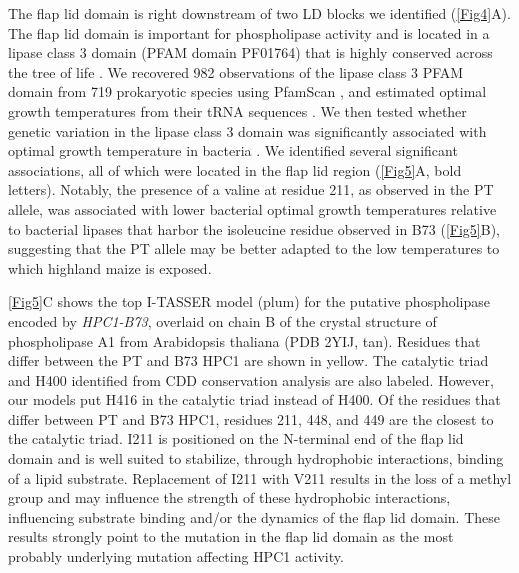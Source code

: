 \documentclass[9pt,twocolumn,twoside,lineno]{biorxiv}
\begin{document}
The flap lid domain is right downstream of two LD blocks we identified (\cref{Fig4}A). 
The flap lid domain is important for phospholipase activity and is located in a lipase class 3 domain (PFAM domain PF01764) that is highly conserved across the tree of life \cite{Jensen2021-zm}. 
We recovered 982 observations of the lipase class 3 PFAM domain from 719 prokaryotic species using PfamScan \cite{Potter2018-tk, El-Gebali2019-pw}, and estimated optimal growth temperatures from their tRNA sequences \cite{Cimen2020-dm}.
We then tested whether genetic variation in the lipase class 3 domain was significantly associated with optimal growth temperature in bacteria \cite{Jensen2021-iv}. 
We identified several significant associations, all of which were located in the flap lid region (\cref{Fig5}A, bold letters).  
Notably, the presence of a valine at residue 211, as observed in the PT allele, was associated with lower bacterial optimal growth temperatures relative to bacterial lipases that harbor the isoleucine residue observed in B73 (\cref{Fig5}B), suggesting that the PT allele may be better adapted to the low temperatures to which highland maize is exposed.

\cref{Fig5}C shows the top I-TASSER model (plum) for the putative phospholipase encoded by \textit{HPC1-B73}, overlaid on chain B of the crystal structure of phospholipase A1 from Arabidopsis thaliana (PDB 2YIJ, tan). 
Residues that differ between the PT and B73 HPC1 are shown in yellow. 
The catalytic triad and H400 identified from CDD conservation analysis are also labeled.
However, our models put H416 in the catalytic triad instead of H400. 
Of the residues that differ between PT and B73 HPC1, residues 211, 448, and 449 are the closest to the catalytic triad. 
I211 is positioned on the N-terminal end of the flap lid domain and is well suited to stabilize, through hydrophobic interactions, binding of a lipid substrate.
Replacement of I211 with V211 results in the loss of a methyl group and may influence the strength of these hydrophobic interactions, influencing substrate binding and/or the dynamics of the flap lid domain.
These results strongly point to the mutation in the flap lid domain as the most probably underlying mutation affecting HPC1 activity.
\end{document}
